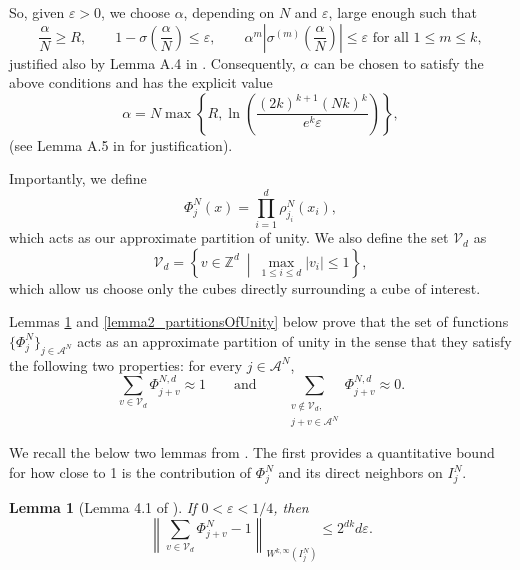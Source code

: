 \documentclass{article}
\newcommand{\fr}{\frac}
\newcommand{\s}{\sigma}
\newcommand{\WnormD}[4]{\left\lVert #1 \right\rVert_{W^{#2, #3} ({#4})}}
\newtheorem{lem}{Lemma}
\numberwithin{Def}{section}
\begin{document}
So, given $\varepsilon > 0$, we choose $\alpha$, depending on $N$ and $\varepsilon$, large enough such that
\begin{equation}
    \fr{\alpha}{N} \geq R, \qquad 1 - \s \left( \fr{\alpha}{N} \right) \leq \varepsilon, \qquad \alpha^m \left| \s^{(m)} \left( \fr{\alpha}{N} \right) \right| \leq \varepsilon \text{ for all } 1 \leq m \leq k,
\end{equation}
justified also by Lemma A.4 in \cite{de2021approximation}. Consequently, $\alpha$ can be chosen to satisfy the above conditions and has the explicit value
\begin{equation}
\label{valueOfAlpha}
    \alpha = N \max \left\{ R, \ln \left( \fr{(2k)^{k+1} (Nk)^k}{e^k \varepsilon} \right) \right\},
\end{equation}
(see Lemma A.5 in \cite{de2021approximation} for justification).


Importantly, we define
\begin{equation}
\label{partition_of_unity_def}
    \Phi_j^{N} (x) = \prod_{i=1}^d \rho_{j_i}^{N} (x_i),
\end{equation}
which acts as our approximate partition of unity. We also define the set $\mathcal{V}_d$ as
\begin{equation}
    \mathcal{V}_d = \left\{ v \in \mathbb{Z}^d \ \middle| \ \max_{1 \leq i \leq d} |v_i| \leq 1 \right\},
\end{equation}
which allow us choose only the cubes directly surrounding a cube of interest.

Lemmas \ref{lemma1_partitionsOfUnity} and \ref{lemma2_partitionsOfUnity} below prove that the set of functions $\{ \Phi_j^N \}_{j \in \mathcal{A}^N}$ acts as an approximate partition of unity in the sense that they satisfy the following two properties: for every $j \in \mathcal{A}^N$,
\begin{equation}
    \sum_{v \in \mathcal{V}_d} \Phi_{j+v}^{N, d} \approx 1 \qquad \text{and} \qquad \sum_{\substack{v \notin \mathcal{V}_d, \\ j+v \in \mathcal{A}^N}} \Phi_{j+v}^{N,d} \approx 0.
\end{equation}

We recall the below two lemmas from \cite{de2021approximation}. The first provides a quantitative bound for how close to 1 is the contribution of $\Phi_j^N$ and its direct neighbors on $I_j^N$.
\begin{lem}[Lemma 4.1 of \cite{de2021approximation}]
\label{lemma1_partitionsOfUnity}
If $0 < \varepsilon < 1/4$, then
\begin{equation}
    \WnormD{\sum_{v \in \mathcal{V}_d} \Phi_{j+v}^{N} - 1}{k}{\infty}{I_j^N} \leq 2^{dk} d \varepsilon.
\end{equation}
\end{lem}
\end{document}
